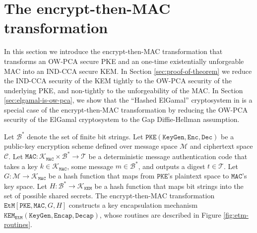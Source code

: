 \documentclass[journal=tches,submission]{iacrtrans}
\newcommand{\pke}{\texttt{PKE}}
\newcommand{\keygen}{\texttt{KeyGen}}
\newcommand{\encrypt}{\texttt{Enc}}
\newcommand{\decrypt}{\texttt{Dec}}
\newcommand{\kem}{\texttt{KEM}}
\newcommand{\encap}{\texttt{Encap}}
\newcommand{\decap}{\texttt{Decap}}
\newcommand{\etm}{\texttt{EtM}}  %
\newcommand{\mac}{\texttt{MAC}}
\begin{document}
\section{The encrypt-then-MAC transformation}\label{sec:main-results}
In this section we introduce the encrypt-then-MAC transformation that transforms an OW-PCA secure PKE and an one-time existentially unforgeable MAC into an IND-CCA secure KEM. In Section \ref{sec:proof-of-theorem} we reduce the IND-CCA security of the KEM tightly to the OW-PCA security of the underlying PKE, and non-tightly to the unforgeability of the MAC. In Section \ref{sec:elgamal-is-ow-pca}, we show that the ``Hashed ElGamal'' cryptosystem in \cite{DBLP:conf/ctrsa/AbdallaBR01} is a special case of the encrypt-then-MAC transformation by reducing the OW-PCA security of the ElGamal cryptosystem to the Gap Diffie-Hellman assumption.

Let $\mathcal{B}^\ast$ denote the set of finite bit strings. Let $\pke(\keygen, \encrypt, \decrypt)$ be a public-key encryption scheme defined over message space $\mathcal{M}$ and ciphertext space $\mathcal{C}$. Let $\mac: \mathcal{K}_\mac \times \mathcal{B}^\ast \rightarrow \mathcal{T}$ be a deterministic message authentication code that takes a key $k \in \mathcal{K}_\mac$, some message $m \in \mathcal{B}^\ast$, and outputs a digest $t \in \mathcal{T}$. Let $G: \mathcal{M} \rightarrow \mathcal{K}_\mac$ be a hash function that maps from $\pke$'s plaintext space to $\mac$'s key space. Let $H: \mathcal{B}^\ast \rightarrow \mathcal{K}_\kem$ be a hash function that maps bit strings into the set of possible shared secrets. The encrypt-then-MAC transformation $\etm[\pke, \mac, G, H]$ constructs a key encapsulation mechanism $\kem_\etm(\keygen, \encap, \decap)$, whose routines are described in Figure \ref{fig:etm-routines}.
\end{document}
